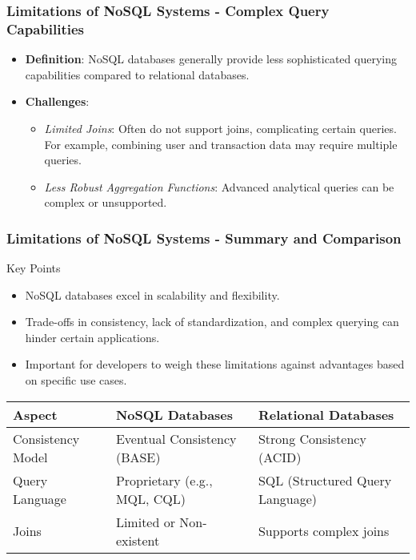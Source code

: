 \documentclass[aspectratio=169]{beamer}
\begin{document}
\begin{frame}[fragile]
    \frametitle{Limitations of NoSQL Systems - Complex Query Capabilities}
    \begin{itemize}
        \item \textbf{Definition}: NoSQL databases generally provide less sophisticated querying capabilities compared to relational databases.
        \item \textbf{Challenges}:
            \begin{itemize}
                \item \textit{Limited Joins}: Often do not support joins, complicating certain queries. For example, combining user and transaction data may require multiple queries.
                \item \textit{Less Robust Aggregation Functions}: Advanced analytical queries can be complex or unsupported.
            \end{itemize}
    \end{itemize}
\end{frame}

\begin{frame}[fragile]
    \frametitle{Limitations of NoSQL Systems - Summary and Comparison}
    \begin{block}{Key Points}
        \begin{itemize}
            \item NoSQL databases excel in scalability and flexibility.
            \item Trade-offs in consistency, lack of standardization, and complex querying can hinder certain applications.
            \item Important for developers to weigh these limitations against advantages based on specific use cases.
        \end{itemize}
    \end{block}

    \begin{table}[]
        \centering
        \begin{tabular}{|l|l|l|}
            \hline
            \textbf{Aspect}         & \textbf{NoSQL Databases}                                      & \textbf{Relational Databases}               \\ \hline
            Consistency Model       & Eventual Consistency (BASE)                                   & Strong Consistency (ACID)                  \\ \hline
            Query Language          & Proprietary (e.g., MQL, CQL)                                 & SQL (Structured Query Language)            \\ \hline
            Joins                   & Limited or Non-existent                                        & Supports complex joins                      \\ \hline
        \end{tabular}
    \end{table}
\end{frame}
\end{document}
